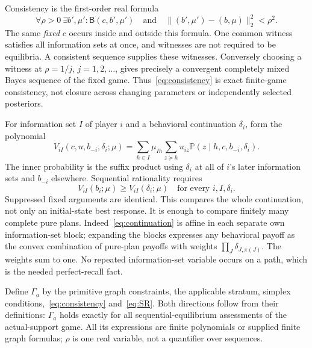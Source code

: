 \documentclass[11pt,a4paper]{article}
\numberwithin{equation}{section}
\theoremstyle{definition}
\newcommand{\Prb}{\mathbb P}
\begin{document}
Consistency is the first-order real formula
\begin{equation}\label{eq:consistency}
 \forall\rho>0\ \exists b',\mu':
 \mathsf B(c,b',\mu')\quad\text{and}\quad
 \|(b',\mu')-(b,\mu)\|_2^2<\rho^2.
\end{equation}
The same \emph{fixed} $c$ occurs inside and outside this formula. One
common witness satisfies all information sets at once, and witnesses are
not required to be equilibria. A consistent sequence supplies these
witnesses. Conversely choosing a witness at $\rho=1/j$, $j=1,2,\ldots$,
gives precisely a convergent completely mixed Bayes sequence of the fixed
game. Thus~\eqref{eq:consistency} is exact finite-game consistency, not
closure across changing parameters or independently selected posteriors.

For information set $I$ of player $i$ and a behavioral continuation
$\delta_i$, form the polynomial
\begin{equation}\label{eq:continuation}
 V_{iI}(c,u,b_{-i},\delta_i;\mu)
 =\sum_{h\in I}\mu_{Ih}
       \sum_{z\succeq h}u_{iz}
          \Prb(z\mid h,c,b_{-i},\delta_i).
\end{equation}
The inner probability is the suffix product using $\delta_i$ at all of
$i$'s later information sets and $b_{-i}$ elsewhere. Sequential rationality
requires
\begin{equation}\label{eq:SR}
 V_{iI}(b_i;\mu)\ge V_{iI}(\delta_i;\mu)
 \quad\text{for every }i,I,\delta_i.
\end{equation}
Suppressed fixed arguments are identical. This compares the whole
continuation, not only an initial-state best response. It is enough to
compare finitely many complete pure plans. Indeed~\eqref{eq:continuation}
is affine in each separate own information-set block; expanding the blocks
expresses any behavioral payoff as the convex combination of pure-plan
payoffs with weights $\prod_J\delta_{J,\pi(J)}$. The weights sum to one.
No repeated information-set variable occurs on a path, which is the needed
perfect-recall fact.

Define $\Gamma_a$ by the primitive graph constraints, the applicable
stratum, simplex conditions,~\eqref{eq:consistency} and~\eqref{eq:SR}.
Both directions follow from their definitions: $\Gamma_a$ holds exactly
for all sequential-equilibrium assessments of the actual-support game.
All its expressions are finite polynomials or supplied finite graph
formulas; $\rho$ is one real variable, not a quantifier over sequences.
\end{document}
